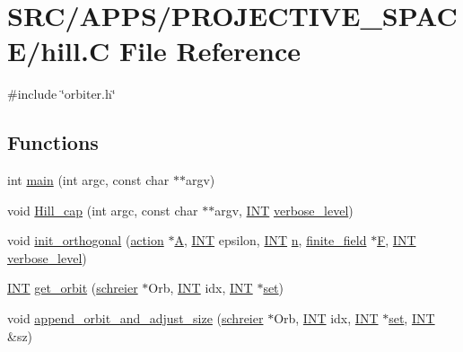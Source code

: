 \hypertarget{hill_8_c}{}\section{S\+R\+C/\+A\+P\+P\+S/\+P\+R\+O\+J\+E\+C\+T\+I\+V\+E\+\_\+\+S\+P\+A\+C\+E/hill.C File Reference}
\label{hill_8_c}
{\ttfamily \#include \char`\"{}orbiter.\+h\char`\"{}}\newline
\subsection*{Functions}
\begin{DoxyCompactItemize}
\item 
int \mbox{\hyperlink{hill_8_c_a217dbf8b442f20279ea00b898af96f52}{main}} (int argc, const char $\ast$$\ast$argv)
\item 
void \mbox{\hyperlink{hill_8_c_a7c2543fe497e681d4b492b16ea7f933e}{Hill\+\_\+cap}} (int argc, const char $\ast$$\ast$argv, \mbox{\hyperlink{galois_8h_a09fddde158a3a20bd2dcadb609de11dc}{I\+NT}} \mbox{\hyperlink{simeon_8_c_a818073fbcc2f439e7c56952f67386122}{verbose\+\_\+level}})
\item 
void \mbox{\hyperlink{hill_8_c_abf695eb9f6a0c10d5aa0c0ce4b60ad6d}{init\+\_\+orthogonal}} (\mbox{\hyperlink{classaction}{action}} $\ast$\mbox{\hyperlink{simeon_8_c_a97833f04c3a9c008df5521a2fc291bb4}{A}}, \mbox{\hyperlink{galois_8h_a09fddde158a3a20bd2dcadb609de11dc}{I\+NT}} epsilon, \mbox{\hyperlink{galois_8h_a09fddde158a3a20bd2dcadb609de11dc}{I\+NT}} \mbox{\hyperlink{simeon_8_c_a7f2cd26777ce0ff3fdaf8d02aacbddfb}{n}}, \mbox{\hyperlink{classfinite__field}{finite\+\_\+field}} $\ast$\mbox{\hyperlink{simeon_8_c_a21a61c535ff7d9d4b674461d3b19fffa}{F}}, \mbox{\hyperlink{galois_8h_a09fddde158a3a20bd2dcadb609de11dc}{I\+NT}} \mbox{\hyperlink{simeon_8_c_a818073fbcc2f439e7c56952f67386122}{verbose\+\_\+level}})
\item 
\mbox{\hyperlink{galois_8h_a09fddde158a3a20bd2dcadb609de11dc}{I\+NT}} \mbox{\hyperlink{hill_8_c_a8f64cd06039ed40b693d54c50274043d}{get\+\_\+orbit}} (\mbox{\hyperlink{classschreier}{schreier}} $\ast$Orb, \mbox{\hyperlink{galois_8h_a09fddde158a3a20bd2dcadb609de11dc}{I\+NT}} idx, \mbox{\hyperlink{galois_8h_a09fddde158a3a20bd2dcadb609de11dc}{I\+NT}} $\ast$\mbox{\hyperlink{nauty_8h_a9690bea211101f22a5e154087590c3da}{set}})
\item 
void \mbox{\hyperlink{hill_8_c_a1740d8cf43f3d5101704eeca6165ea10}{append\+\_\+orbit\+\_\+and\+\_\+adjust\+\_\+size}} (\mbox{\hyperlink{classschreier}{schreier}} $\ast$Orb, \mbox{\hyperlink{galois_8h_a09fddde158a3a20bd2dcadb609de11dc}{I\+NT}} idx, \mbox{\hyperlink{galois_8h_a09fddde158a3a20bd2dcadb609de11dc}{I\+NT}} $\ast$\mbox{\hyperlink{nauty_8h_a9690bea211101f22a5e154087590c3da}{set}}, \mbox{\hyperlink{galois_8h_a09fddde158a3a20bd2dcadb609de11dc}{I\+NT}} \&sz)

\end{DoxyCompactItemize}
